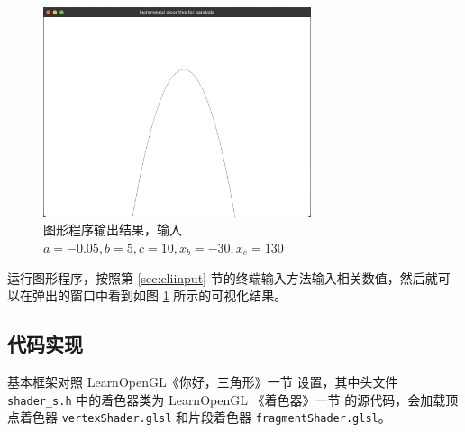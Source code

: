 \documentclass[math-font=newcm]{sjtuarticle}
\providecommand{\code}[2]{}
\begin{document}
\begin{figure}[h]
    \centering
    \includegraphics[width=0.7\textwidth]{gui.png}
    \caption{图形程序输出结果，输入 $a=-0.05,b=5,c=10,x_b=-30,x_e=130$}\label{fig:gui}
\end{figure}

运行图形程序，按照第 \ref{sec:cliinput} 节的终端输入方法输入相关数值，然后就可以在弹出的窗口中看到如图 \ref{fig:gui} 所示的可视化结果。


\subsection{代码实现}

基本框架对照 LearnOpenGL《你好，三角形》一节\cite{hellotri} 设置，其中头文件 \verb"shader_s.h" 中的着色器类为 LearnOpenGL 《着色器》一节\cite{shaders} 的源代码\cite{shadersrc}，会加载顶点着色器 \verb"vertexShader.glsl" 和片段着色器 \verb"fragmentShader.glsl"。

\code{../source/src/main.cpp}{c++}

\code{../source/shader/vertexShader.glsl}{c}

\code{../source/shader/fragmentShader.glsl}{c}

\printbibliography[heading=bibintoc]
\end{document}
